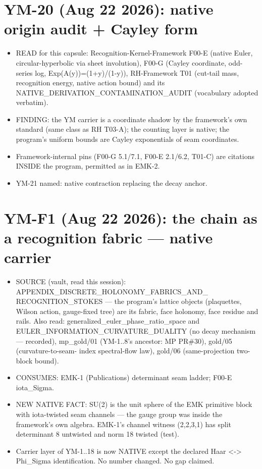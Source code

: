 \hypertarget{ym-20-aug-22-2026-native-origin-audit-cayley-form}{%
\section{YM-20 (Aug 22 2026): native origin audit + Cayley form}\label{ym-20-aug-22-2026-native-origin-audit-cayley-form}}

\begin{itemize}
\tightlist
\item
  READ for this capsule: Recognition-Kernel-Framework F00-E (native
  Euler, circular-hyperbolic via sheet involution), F00-G (Cayley
  coordinate, odd-series log, Exp(A(y))=(1+y)/(1-y)), RH-Framework T01
  (cut-tail mass, recognition energy, native action bound) and its
  NATIVE\_DERIVATION\_CONTAMINATION\_AUDIT (vocabulary adopted verbatim).
\item
  FINDING: the YM carrier is a coordinate shadow by the framework's own
  standard (same class as RH T03-A); the counting layer is native; the
  program's uniform bounds are Cayley exponentials of seam coordinates.
\item
  Framework-internal pins (F00-G 5.1/7.1, F00-E 2.1/6.2, T01-C) are
  citations INSIDE the program, permitted as in EMK-2.
\item
  YM-21 named: native contraction replacing the decay anchor.
\end{itemize}

\hypertarget{ym-f1-aug-22-2026-the-chain-as-a-recognition-fabric-native-carrier}{%
\section{YM-F1 (Aug 22 2026): the chain as a recognition fabric --- native carrier}\label{ym-f1-aug-22-2026-the-chain-as-a-recognition-fabric-native-carrier}}

\begin{itemize}
\tightlist
\item
  SOURCE (vault, read this session): APPENDIX\_DISCRETE\_HOLONOMY\_FABRICS\_AND\_
  RECOGNITION\_STOKES --- the program's lattice objects (plaquettes, Wilson
  action, gauge-fixed tree) are its fabric, face holonomy, face residue
  and rails. Also read: generalized\_euler\_phase\_ratio\_space and
  EULER\_INFORMATION\_CURVATURE\_DUALITY (no decay mechanism --- recorded),
  mp\_gold/01 (YM-1..8's ancestor: MP PR\#30), gold/05 (curvature-to-seam-
  index spectral-flow law), gold/06 (same-projection two-block bound).
\item
  CONSUMES: EMK-1 (Publications) determinant seam ladder; F00-E iota\_Sigma.
\item
  NEW NATIVE FACT: SU(2) is the unit sphere of the EMK primitive block
  with iota-twisted seam channels --- the gauge group was inside the
  framework's own algebra. EMK-1's channel witness (2,2,3,1) has split
  determinant 8 untwisted and norm 18 twisted (test).
\item
  Carrier layer of YM-1..18 is now NATIVE except the declared Haar \textless-\textgreater{}
  Phi\_Sigma identification. No number changed. No gap claimed.
\end{itemize}

